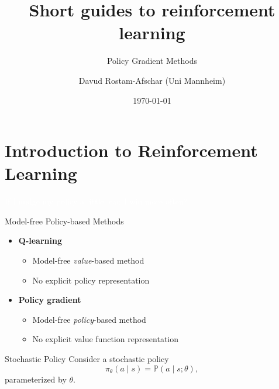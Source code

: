 \documentclass[11pt,table]{beamer}
\title[]{Short guides to reinforcement learning}
\subtitle[]{Policy Gradient Methods}
\author[D. Rostam-Afschar]{\textcolor{gray1}{Davud Rostam-Afschar (Uni Mannheim)}}
\date[]{\today}
\begin{document}
\begin{frame}[plain]
  \titlepage
\end{frame}


\section{Introduction to Reinforcement Learning}
{
\begin{frame}
\centering
\Huge
\textcolor{white}{If I nudge my policy a little, can I win more often?}
\thispagestyle{empty}
\end{frame}
}




\begin{frame}{Model-free Policy-based Methods}
  \begin{itemize}
    \item \textbf{Q-learning}
      \begin{itemize}
        \item Model-free \emph{value}-based method
        \item No explicit policy representation\\[4ex]
      \end{itemize}
    \item \textbf{Policy gradient}
      \begin{itemize}
        \item Model-free \emph{policy}-based method
        \item No explicit value function representation
      \end{itemize}
  \end{itemize}
\end{frame}

\begin{frame}{Stochastic Policy}
  Consider a stochastic policy
  \[
    \pi_\theta(a\mid s) = \mathbb{P}(a\mid s; \theta),
  \]
  parameterized by $\theta$.
  \bigskip
	
\end{frame}
\end{document}
